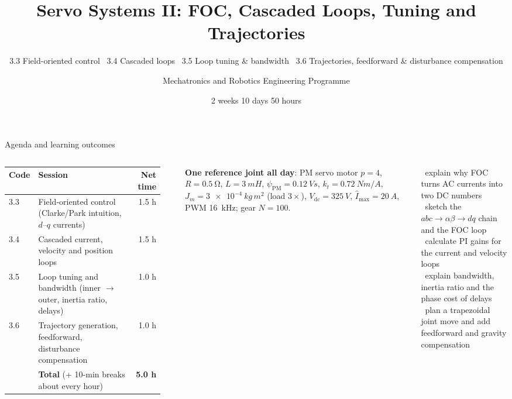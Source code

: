 \documentclass[aspectratio=169,10pt]{beamer}
\title[W1D5 -- Servo Systems II]{Servo Systems II: FOC, Cascaded Loops, Tuning and Trajectories}
\subtitle{3.3 Field-oriented control \textbullet\ 3.4 Cascaded loops \textbullet\ 3.5 Loop tuning \& bandwidth \textbullet\ 3.6 Trajectories, feedforward \& disturbance compensation}
\author{Mechatronics and Robotics Engineering Programme}
\institute{Week 1 \textperiodcentered{} Day 5}
\date{2 weeks \textperiodcentered{} 10 days \textperiodcentered{} 50 hours}
\begin{document}
\begin{frame}[plain]\titlepage\end{frame}

\begin{frame}[t]{Agenda and learning outcomes}
\begin{columns}[T,onlytextwidth]
\footnotesize
\begin{tabularx}{\linewidth}{@{}l X r@{}}
\toprule
\textbf{Code} & \textbf{Session} & \textbf{Net time}\\
\midrule
3.3 & Field-oriented control (Clarke/Park intuition, $d$--$q$ currents) & 1.5 h\\
3.4 & Cascaded current, velocity and position loops & 1.5 h\\
3.5 & Loop tuning and bandwidth (inner $\rightarrow$ outer, inertia ratio, delays) & 1.0 h\\
3.6 & Trajectory generation, feedforward, disturbance compensation & 1.0 h\\
\midrule
 & \textbf{Total} (+ 10-min breaks about every hour) & \textbf{5.0 h}\\
\bottomrule
\end{tabularx}\\[2mm]
\begin{notebox}
\textbf{One reference joint all day}: PM servo motor $p=4$, $R=\SI{0.5}{\ohm}$, $L=\SI{3}{mH}$,
$\psi_\text{PM}=\SI{0.12}{Vs}$, $k_t=\SI{0.72}{Nm/A}$, $J_m=\SI{3e-4}{kg\,m^2}$ (load $3\times$),
$V_\text{dc}=\SI{325}{V}$, $\hat I_\text{max}=\SI{20}{A}$, PWM \SI{16}{kHz}; gear $N=100$.
\end{notebox}
\begin{keybox}
\small
\checkitem\ explain why FOC turns AC currents into two DC numbers\\
\checkitem\ sketch the $abc\rightarrow\alpha\beta\rightarrow dq$ chain and the FOC loop\\
\checkitem\ calculate PI gains for the current and velocity loops\\
\checkitem\ explain bandwidth, inertia ratio and the phase cost of delays\\
\checkitem\ plan a trapezoidal joint move and add feedforward and gravity compensation
\end{keybox}
\end{columns}
\end{frame}
\end{document}
